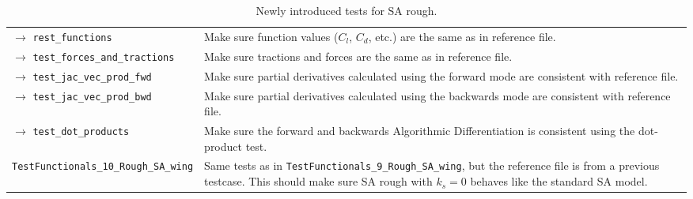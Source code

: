 \begin{table}[H]
\begin{tabularx}{\textwidth}{lX}
    $\rightarrow$ \texttt{rest\_functions}        & Make sure function values
    ($C_{l}$, $C_{d}$, etc.) are the same as in reference file.\\

    $\rightarrow$ \texttt{test\_forces\_and\_tractions} & Make sure tractions and
    forces are the same as in reference file.\\

    $\rightarrow$ \texttt{test\_jac\_vec\_prod\_fwd} & Make sure partial
    derivatives calculated using the forward mode are consistent with reference
    file. \\

    $\rightarrow$ \texttt{test\_jac\_vec\_prod\_bwd} & Make sure partial
    derivatives calculated using the backwards mode are consistent with reference
    file. \\

    $\rightarrow$ \texttt{test\_dot\_products} & Make sure the forward and
    backwards Algorithmic Differentiation is consistent using the dot-product test. \\

    \midrule

    \texttt{TestFunctionals\_10\_Rough\_SA\_wing} & Same tests as in
    \texttt{TestFunctionals\_9\_Rough\_SA\_wing}, but the reference file is from a
    previous testcase. This should make sure SA rough with $k_{s} = 0$ behaves like
    the standard SA model. \\

  \bottomrule

  \end{tabularx}
  \endgroup
  \caption{Newly introduced tests for SA rough.}
  \label{tab:tests}
\end{table}
